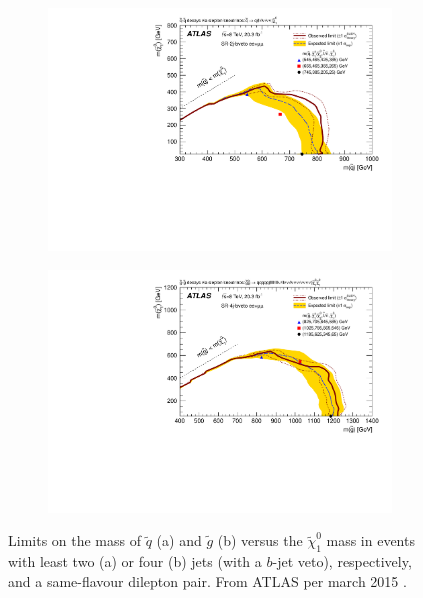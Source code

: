 \documentclass[twoside,english]{uiofysmaster}
\begin{document}
\begin{figure}[hbt]
\centering
\begin{subfigure}[b]{0.45\textwidth}
	\includegraphics[width=\textwidth]{figures/susyintro/Edge_wband1_wfixSigXSecband1_showcms0_EdgeAnalysisUnblindXsec_SR2jSF.pdf}
	\caption{ }
	\label{fig:ATLAS_neutralinogluino_a}
\end{subfigure}
\begin{subfigure}[b]{0.45\textwidth}
	\includegraphics[width=\textwidth]{figures/susyintro/Edge_wband1_wfixSigXSecband1_showcms0_EdgeAnalysisUnblindXsec_SR4jSF.pdf}
	\caption{ }
	\label{fig:ATLAS_neutralinogluino_b}
\end{subfigure}
\caption{Limits on the mass of $\tilde q$ (a) and $\tilde g$ (b) versus the $\tilde \chi_1^0$ mass in events with least two (a) or four (b) jets (with a $b$-jet veto), respectively, and a same-flavour dilepton pair. From ATLAS per march 2015 \cite{Aad:2015wqa}.}
\label{fig:ATLAS_neutralinogluino}
\end{figure}
\end{document}
